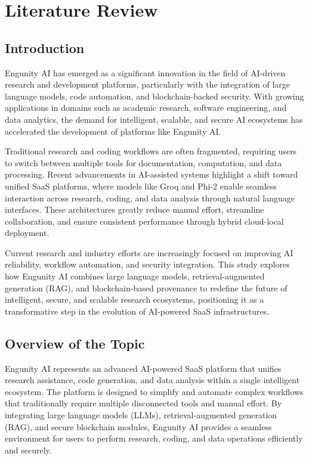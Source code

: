 \chapter{Literature Review}
\section{Introduction}
Engunity AI has emerged as a significant innovation in the field of AI-driven research and development platforms, particularly with the integration of large language models, code automation, and blockchain-backed security. With growing applications in domains such as academic research, software engineering, and data analytics, the demand for intelligent, scalable, and secure AI ecosystems has accelerated the development of platforms like Engunity AI.

Traditional research and coding workflows are often fragmented, requiring users to switch between multiple tools for documentation, computation, and data processing. Recent advancements in AI-assisted systems highlight a shift toward unified SaaS platforms, where models like Groq and Phi-2 enable seamless interaction across research, coding, and data analysis through natural language interfaces. These architectures greatly reduce manual effort, streamline collaboration, and ensure consistent performance through hybrid cloud-local deployment.

Current research and industry efforts are increasingly focused on improving AI reliability, workflow automation, and security integration. This study explores how Engunity AI combines large language models, retrieval-augmented generation (RAG), and blockchain-based provenance to redefine the future of intelligent, secure, and scalable research ecosystems, positioning it as a transformative step in the evolution of AI-powered SaaS infrastructures.



\pagebreak


\section{Overview of the Topic}

Engunity AI represents an advanced AI-powered SaaS platform that unifies research assistance, code generation, and data analysis within a single intelligent ecosystem. The platform is designed to simplify and automate complex workflows that traditionally require multiple disconnected tools and manual effort. By integrating large language models (LLMs), retrieval-augmented generation (RAG), and secure blockchain modules, Engunity AI provides a seamless environment for users to perform research, coding, and data operations efficiently and securely.

